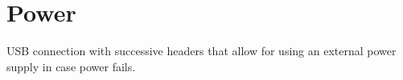 \documentclass[../main/report.tex]{subfiles}
\begin{document}
\section{Power}
USB connection with successive headers that allow for using an external power supply in case power fails.
\end{document}
